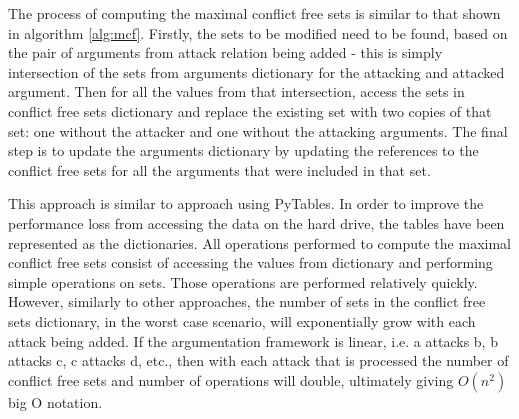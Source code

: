 
The process of computing the maximal conflict free sets is similar to that shown in algorithm \ref{alg:mcf}. Firstly, the sets to be modified need to be found, based on the pair of arguments from attack relation being added - this is simply intersection of the sets from arguments dictionary for the attacking and attacked argument. Then for all the values from that intersection, access the sets in conflict free sets dictionary and replace the existing set with two copies of that set: one without the attacker and one without the attacking arguments. The final step is to update the arguments dictionary by updating the references to the conflict free sets for all the arguments that were included in that set.

This approach is similar to approach using PyTables. In order to improve the performance loss from accessing the data on the hard drive, the tables have been represented as the dictionaries. All operations performed to compute the maximal conflict free sets consist of accessing the values from dictionary and performing simple operations on sets. Those operations are performed relatively quickly. However, similarly to other approaches, the number of sets in the conflict free sets dictionary, in the worst case scenario, will exponentially grow with each attack being added. If the argumentation framework is linear, i.e. a attacks b, b attacks c, c attacks d, etc., then with each attack that is processed the number of conflict free sets and number of operations will double, ultimately giving $O(n^2)$ big O notation. 



